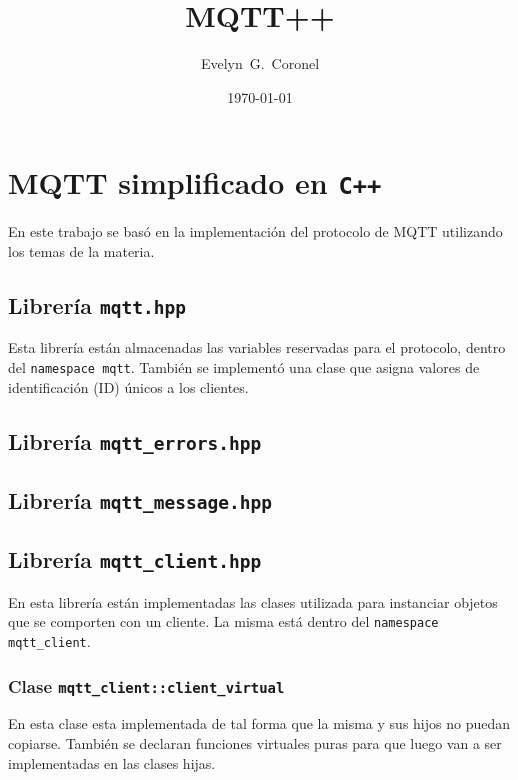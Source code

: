 


\title{MQTT++}
\author{Evelyn~G.~Coronel}


\date[]{\lowercase{\today}} %

\maketitle

\section{MQTT simplificado en \texttt{C++}}

En este trabajo se basó en la implementación del protocolo de MQTT utilizando los temas de la materia. 


\subsection{Librería \texttt{mqtt.hpp}}

Esta  librería están almacenadas las variables reservadas para el protocolo, dentro del \texttt{namespace mqtt}. También se implementó una clase que asigna valores de identificación (ID) únicos a los clientes.

\subsection{Librería \texttt{mqtt\_errors.hpp}}

\subsection{Librería \texttt{mqtt\_message.hpp}}

\subsection{Librería \texttt{mqtt\_client.hpp}}

    En esta librería están implementadas las clases utilizada para instanciar objetos que se comporten con un cliente. La misma está dentro del \texttt{namespace mqtt\_client}.

    \subsubsection{Clase \texttt{mqtt\_client::client\_virtual}}
    En esta clase esta implementada de tal forma que la misma y sus hijos no puedan copiarse. También se declaran funciones virtuales puras para que luego van a ser implementadas en las clases hijas.

